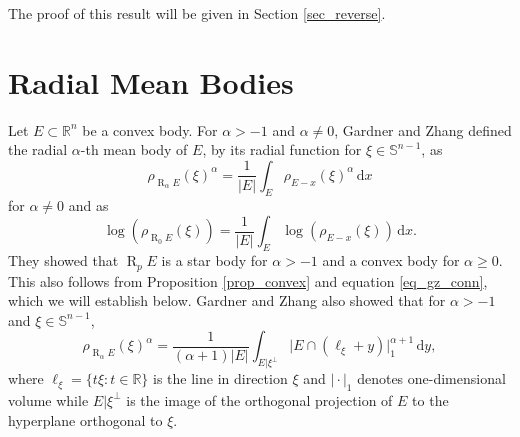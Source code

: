 \documentclass{amsart}
\newcommand{\omr}[1]{\operatorname{R}_{#1}\!}
\newcommand{\R}{\mathbb R}
\newcommand{\sn}{{\mathbb S}^{n-1}}
\renewcommand{\d}{\,\mathrm{d}}
\newcommand{\vol}[1]{\vert #1\vert}
\begin{document}
\noindent
The proof of this result will be given in Section \ref{sec_reverse}.



\goodbreak
\section{Radial Mean Bodies}\label{sec_GZ}

Let $E\subset \R^n$ be a convex body. For $\alpha>-1$ and $\alpha\ne 0$, Gardner and Zhang \cite{GZ} defined the radial $\alpha$-th mean body of $E$, by its radial function for $\xi\in\sn$, as
\begin{equation}\label{def_ralpha}
\rho_{\omr \alpha E}(\xi)^\alpha = \frac 1{\vol{E}}\int_E \rho_{E-x}(\xi)^\alpha \d x
\end{equation}
for $\alpha\ne0$ and as
\[
\log(\rho_{\omr 0 E}(\xi)) = \frac 1{\vol{E}}\int_E \log(\rho_{E-x}(\xi)) \d x.
\]
They showed that $\omr p E$ is a star body for $\alpha>-1$ and a convex body for $\alpha\ge0$. 
This also follows from Proposition \ref{prop_convex} and equation \eqref{eq_gz_conn}, which we will establish below. Gardner and Zhang \cite{GZ} also showed that for $\alpha>-1$ and $\xi\in\sn$,
\begin{equation}
\rho_{\omr \alpha E}(\xi)^\alpha =\frac1{(\alpha+1)\vol{E}}\int_{E\vert \xi^\perp} \vol{E\cap (\ell_\xi+y)}_1^{\alpha+1}\d y,
\end{equation}
where $\ell_\xi=\{t\xi: t\in\R\}$ is the line in direction $\xi$ and $\vol{\cdot}_1$ denotes one-dimensional volume while $E\vert \xi^\perp$ is the image of the orthogonal projection of $E$ to the hyperplane orthogonal to $\xi$. 
\end{document}
